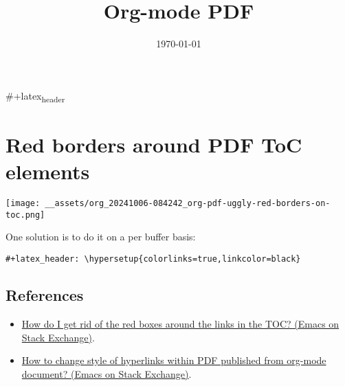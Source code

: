 \documentclass[11pt]{article}
\date{\today}
\title{Org-mode PDF}
\begin{document}
\maketitle
\tableofcontents

\#+latex\textsubscript{header}

\section{Red borders around PDF ToC elements}
\label{sec:org1169bd8}

\begin{center}
\texttt{[image: \_\_assets/org\_20241006-084242\_org-pdf-uggly-red-borders-on-toc.png]}
\end{center}

One solution is to do it on a per buffer basis:

\begin{verbatim}
#+latex_header: \hypersetup{colorlinks=true,linkcolor=black}
\end{verbatim}

\subsection{References}
\label{sec:orgfec15f8}

\begin{itemize}
\item \href{https://emacs.stackexchange.com/questions/29640/how-do-i-get-rid-of-the-red-boxes-around-the-links-in-the-toc}{How do I get rid of the red boxes around the links in the TOC?
(Emacs on Stack Exchange)}.
\item \href{https://emacs.stackexchange.com/questions/12878/how-to-change-style-of-hyperlinks-within-pdf-published-from-org-mode-document}{How to change style of hyperlinks within PDF published from org-mode document? (Emacs on Stack Exchange)}.
\end{itemize}
\end{document}
